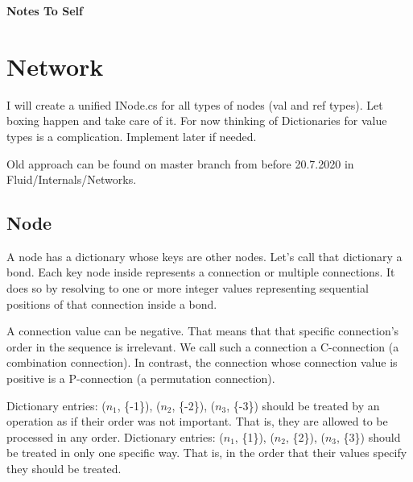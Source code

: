 

\cfoot{\thepage}								      %
\renewcommand{\headrulewidth}{0.0cm}			%
\renewcommand{\footrulewidth}{0.0cm}			%
\lstset{language=bash,basicstyle=\small\sffamily}



\begin{center}
   \textbf{\LARGE{Notes To Self}}\\[0.5cm]
\end{center}

\section{Network}
I will create a unified INode.cs for all types of nodes (val and ref types). Let boxing happen and take care of it. For now thinking of Dictionaries for value types is a complication. Implement later if needed.

Old approach can be found on master branch from before 20.7.2020 in Fluid/Internals/Networks.

\subsection{Node}
A node has a dictionary whose keys are other nodes. Let's call that dictionary a bond. Each key node inside represents a connection or multiple connections. It does so by resolving to one or more integer values representing sequential positions of that connection inside a bond.

A connection value can be negative. That means that that specific connection's order in the sequence is irrelevant. We call such a connection a C-connection (a combination connection). In contrast, the connection whose connection value is positive is a P-connection (a permutation connection).

Dictionary entries: ($n_1$, \{-1\}), ($n_2$, \{-2\}), ($n_3$, \{-3\}) should be treated by an operation as if their order was not important. That is, they are allowed to be processed in any order.
Dictionary entries: ($n_1$, \{1\}), ($n_2$, \{2\}), ($n_3$, \{3\}) should be treated in only one specific way. That is, in the order that their values specify they should be treated.

